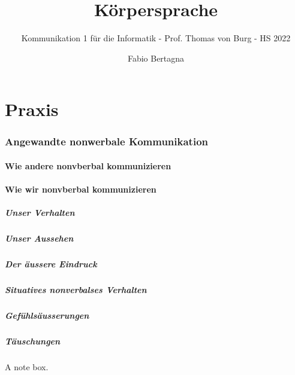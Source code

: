 \documentclass[
    invert-title=false,
    titlepage=true,
    titleimage-ratio=1011,
    parskip=half-,
]{bfhpub}                %
\title{Körpersprache}
\subtitle{Kommunikation 1 für die Informatik - Prof. Thomas von Burg - HS 2022}
\author{Fabio Bertagna}
\institute{Kommunikation 1 für die Informatik}
\begin{document}
    \maketitle
    \tableofcontents

    \pagebreak
    
    
    
    
    


    \part{Praxis}


    \section{Angewandte nonwerbale Kommunikation}

    \subsection{Wie andere nonvberbal kommunizieren}
    

    \subsection{Wie wir nonvberbal kommunizieren}

    \subsubsection{Unser Verhalten}

    \subsubsection{Unser Aussehen}

    \subsubsection{Der äussere Eindruck}

    \subsubsection{Situatives nonverbalses Verhalten}

    \subsubsection{Gefühlsäusserungen}

    \subsubsection{Täuschungen}


    \begin{bfhNoteBox}
        A note box.
    \end{bfhNoteBox}

    \printbibliography
\end{document}
